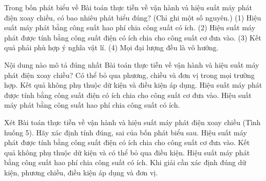 \begin{ex}
Trong bốn phát biểu về Bài toán thực tiễn về vận hành và hiệu suất máy phát điện xoay chiều, có bao nhiêu phát biểu đúng? (Chỉ ghi một số nguyên.) (1) Hiệu suất máy phát bằng công suất hao phí chia công suất có ích. (2) Hiệu suất máy phát được tính bằng công suất điện có ích chia cho công suất cơ đưa vào. (3) Kết quả phải phù hợp ý nghĩa vật lí. (4) Mọi đại lượng đều là vô hướng.
\end{ex}

\begin{ex}
Nội dung nào mô tả đúng nhất Bài toán thực tiễn về vận hành và hiệu suất máy phát điện xoay chiều?
\choice
{Có thể bỏ qua phương, chiều và đơn vị trong mọi trường hợp.}
{Kết quả không phụ thuộc dữ kiện và điều kiện áp dụng.}
{\True Hiệu suất máy phát được tính bằng công suất điện có ích chia cho công suất cơ đưa vào.}
{Hiệu suất máy phát bằng công suất hao phí chia công suất có ích.}
\end{ex}

\begin{ex}
Xét Bài toán thực tiễn về vận hành và hiệu suất máy phát điện xoay chiều (Tình huống 5). Hãy xác định tính đúng, sai của bốn phát biểu sau.
\choiceTF
{\True Hiệu suất máy phát được tính bằng công suất điện có ích chia cho công suất cơ đưa vào.}
{Kết quả không phụ thuộc dữ kiện và có thể bỏ qua điều kiện.}
{Hiệu suất máy phát bằng công suất hao phí chia công suất có ích.}
{\True Khi giải cần xác định đúng dữ kiện, phương chiều, điều kiện áp dụng và đơn vị.}
\end{ex}

